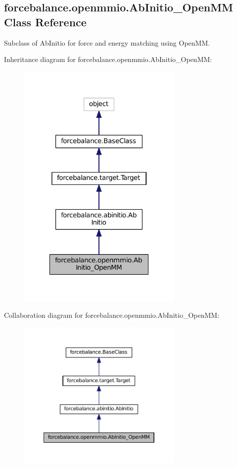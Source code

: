 \hypertarget{classforcebalance_1_1openmmio_1_1AbInitio__OpenMM}{\subsection{forcebalance.\-openmmio.\-Ab\-Initio\-\_\-\-Open\-M\-M Class Reference}
\label{classforcebalance_1_1openmmio_1_1AbInitio__OpenMM}
}


Subclass of Ab\-Initio for force and energy matching using Open\-M\-M.  




Inheritance diagram for forcebalance.\-openmmio.\-Ab\-Initio\-\_\-\-Open\-M\-M\-:\nopagebreak
\begin{figure}[H]
\begin{center}
\leavevmode
\includegraphics[width=228pt]{classforcebalance_1_1openmmio_1_1AbInitio__OpenMM__inherit__graph}
\end{center}
\end{figure}


Collaboration diagram for forcebalance.\-openmmio.\-Ab\-Initio\-\_\-\-Open\-M\-M\-:\nopagebreak
\begin{figure}[H]
\begin{center}
\leavevmode
\includegraphics[width=228pt]{classforcebalance_1_1openmmio_1_1AbInitio__OpenMM__coll__graph}
\end{center}
\end{figure}

